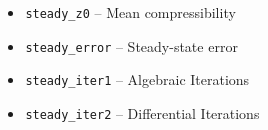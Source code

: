 \documentclass[%
aspectratio=43 %
,table %
]{beamer}
\begin{document}
\begin{frame}
\begin{columns}
\begin{column}[t]{.43\textwidth}
\begin{itemize}
\end{itemize}
\end{column}

\begin{column}[t]{.58\textwidth}
\begin{itemize}\itemsep1ex\small

 \item \texttt{steady\_z0} -- Mean compressibility

 \item \texttt{steady\_error} -- Steady-state error

 \item \texttt{steady\_iter1} -- Algebraic Iterations

 \item \texttt{steady\_iter2} -- Differential Iterations 

\end{itemize}
\end{column}

\end{columns}

\end{frame}

\end{document}
